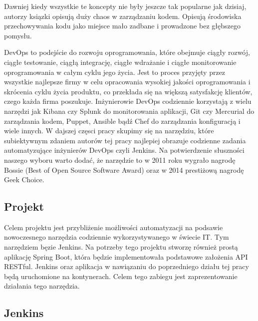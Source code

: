 Dawniej kiedy wszystkie te koncepty nie były jeszcze tak popularne jak dzisiaj, autorzy ksiązki opisują duży chaos w zarządzaniu kodem. Opisują środowiska przechowywania kodu jako miejsce mało zadbane i prowadzone bez głębszego pomysłu.

DevOps to podejście do rozwoju oprogramowania, które obejmuje ciągły rozwój, ciągłe testowanie, ciągłą integrację, ciągłe wdrażanie i ciągłe monitorowanie oprogramowania w całym cyklu jego życia. Jest to proces przyjęty przez wszystkie najlepsze firmy w celu opracowania wysokiej jakości oprogramowania i skrócenia cyklu życia produktu, co przekłada się na większą satysfakcję klientów, czego każda firma poszukuje.
Inżynierowie DevOps codziennie korzystają z wielu narzędzi jak Kibana czy Splunk do monitorowania aplikacji, Git czy Mercurial do zarządzania kodem, Puppet, Ansible bądź Chef do zarządzania konfiguracją i wiele innych. 
W dajszej częsci pracy skupimy się na narzędziu, które subiektywnym zdaniem autorów tej pracy najlepiej obrazuje codzienne zadania automatyzujące inżynierów DevOps czyli Jenkins.
Na potwierdzenie słuszności naszego wyboru warto dodać, że narzędzie to w 2011 roku wygrało nagrodę Bossie (Best of Open Source Software Award) oraz w 2014 prestiżową nagrodę Geek Choice.  

\subsection{Projekt}

Celem projektu jest przybliżenie możliwości automatyzacji na podsawie nowoczesnego narzędzia codziennie wykorzystywanego w świecie IT. Tym narzędziem bęzie Jenkins. 
Na potrzeby tego projektu stworzę również prostą aplikację Spring Boot, która będzie implementowała podstawowe założenia API RESTful. Jenkins oraz aplikacja w nawiązaniu do poprzedniego działu tej pracy będą uruchomione na kontynerach. Celem tego zabiegu jest zaprezentowanie działania tego narzędzia. 

\subsection{Jenkins}

